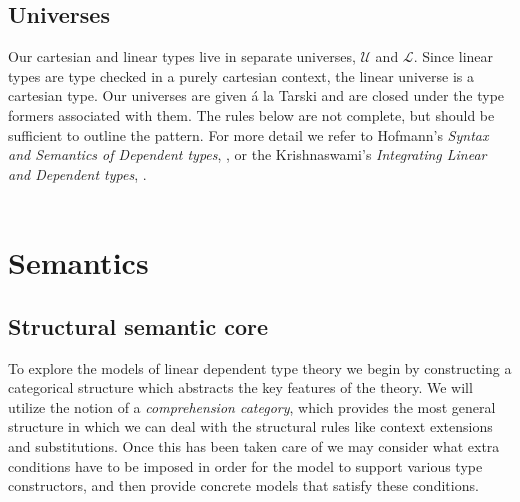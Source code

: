 \subsection{Universes}
Our cartesian and linear types live in separate universes, $\mathcal{U}$ and $\mathcal{L}$. Since linear types are type checked in a purely cartesian context, the linear universe is a cartesian type. Our universes are given á la Tarski and are closed under the type formers associated with them. The rules below are not complete, but should be sufficient to outline the pattern. For more detail we refer to Hofmann's \textit{Syntax and Semantics of Dependent types}, \cite{hofmann1997syntax}, or the Krishnaswami's \textit{Integrating Linear and Dependent types}, \cite{krishnaswami}.\\
\\
\section{Semantics}
\subsection{Structural semantic core}
To explore the models of linear dependent type theory we begin by constructing a categorical structure which abstracts the key features of the theory. We will utilize the notion of a \textit{comprehension category}, which provides the most general structure in which we can deal with the structural rules like context extensions and substitutions. Once this has been taken care of we may consider what extra conditions have to be imposed in order for the model to support various type constructors, and then provide concrete models that satisfy these conditions.\\

